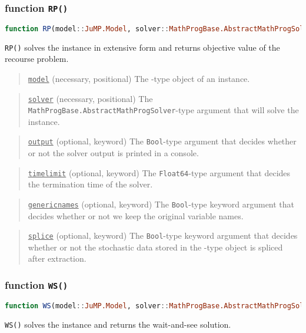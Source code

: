 \subsubsection{function \texttt{RP()}}
\begin{lstlisting}[frame=single,language=julia]
function RP(model::JuMP.Model, solver::MathProgBase.AbstractMathProgSolver; output::Bool=false, timelimit::Float64=Inf, genericnames::Bool=true, splice::Bool=false)
\end{lstlisting}
\texttt{RP()} solves the instance in extensive form and returns objective value of the recourse problem.
\begin{quote}
	\noindent\underline{\texttt{model}} (necessary, positional) The \jumpmodel-type object of an instance.
\end{quote}

\begin{quote}
	\noindent\underline{\texttt{solver}} (necessary, positional) The \texttt{MathProgBase.AbstractMathProgSolver}-type argument that will solve the instance.
\end{quote}

\begin{quote}
	\noindent\underline{\texttt{output}} (optional, keyword) The \texttt{Bool}-type argument that decides whether or not the solver output is printed in a console.
\end{quote}

\begin{quote}
	\noindent\underline{\texttt{timelimit}} (optional, keyword) The \texttt{Float64}-type argument that decides the termination time of the solver.
\end{quote}

\begin{quote}
	\noindent\underline{\texttt{genericnames}} (optional, keyword) The \texttt{Bool}-type keyword argument that decides whether or not we keep the original variable names. 
\end{quote}

\begin{quote}
	\noindent\underline{\texttt{splice}} (optional, keyword) The \texttt{Bool}-type keyword argument that decides whether or not the stochastic data stored in the \jumpmodel-type object is spliced after extraction.
\end{quote}

\subsubsection{function \texttt{WS()}}
\begin{lstlisting}[frame=single,language=julia]
function WS(model::JuMP.Model, solver::MathProgBase.AbstractMathProgSolver; output::Bool=false, ss_timelimit::Float64=Inf, splice::Bool=false)
\end{lstlisting}
\texttt{WS()} solves the instance and returns the wait-and-see solution.

